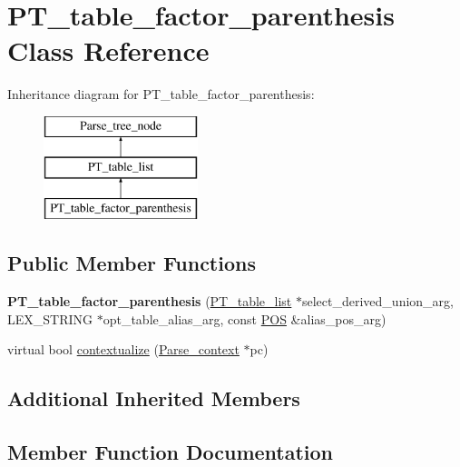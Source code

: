 \hypertarget{classPT__table__factor__parenthesis}{}\section{P\+T\+\_\+table\+\_\+factor\+\_\+parenthesis Class Reference}
\label{classPT__table__factor__parenthesis}
Inheritance diagram for P\+T\+\_\+table\+\_\+factor\+\_\+parenthesis\+:\begin{figure}[H]
\begin{center}
\leavevmode
\includegraphics[height=3.000000cm]{classPT__table__factor__parenthesis}
\end{center}
\end{figure}
\subsection*{Public Member Functions}
\begin{DoxyCompactItemize}
\item 
\mbox{\label{classPT__table__factor__parenthesis_ac939ba69367ca632f12e61ec68c75cc2}} 
{\bfseries P\+T\+\_\+table\+\_\+factor\+\_\+parenthesis} (\mbox{\hyperlink{classPT__table__list}{P\+T\+\_\+table\+\_\+list}} $\ast$select\+\_\+derived\+\_\+union\+\_\+arg, L\+E\+X\+\_\+\+S\+T\+R\+I\+NG $\ast$opt\+\_\+table\+\_\+alias\+\_\+arg, const \mbox{\hyperlink{structYYLTYPE}{P\+OS}} \&alias\+\_\+pos\+\_\+arg)
\item 
virtual bool \mbox{\hyperlink{classPT__table__factor__parenthesis_a343d7a8881b5425d2f3f38b6932b1c14}{contextualize}} (\mbox{\hyperlink{structParse__context}{Parse\+\_\+context}} $\ast$pc)
\end{DoxyCompactItemize}
\subsection*{Additional Inherited Members}


\subsection{Member Function Documentation}
\mbox{\label{classPT__table__factor__parenthesis_a343d7a8881b5425d2f3f38b6932b1c14}} 
